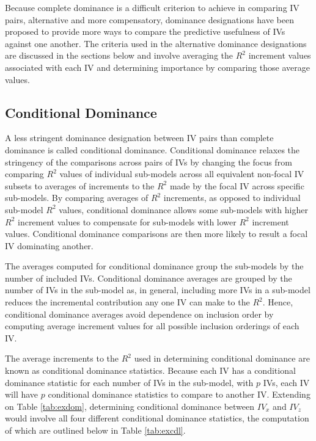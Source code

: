 \documentclass[ShortAfour,times,sageapa]{sagej}
\begin{document}
	Because complete dominance is a difficult criterion to achieve in comparing IV pairs, alternative and more compensatory, dominance designations have been proposed to provide more ways to compare the predictive usefulness of IVs against one another.
	The criteria used in the alternative dominance designations are discussed in the sections below and involve averaging the $R^2$ increment values associated with each IV and determining importance by comparing those average values.
	
	\subsection{Conditional Dominance}
	
	A less stringent dominance designation between IV pairs than complete dominance is called conditional dominance.
	Conditional dominance relaxes the stringency of the comparisons across pairs of IVs by changing the focus from comparing $R^2$ values of individual sub-models across all equivalent non-focal IV subsets to averages of increments to the $R^2$ made by the focal IV across specific sub-models.	
	By comparing averages of $R^2$ increments, as opposed to individual sub-model $R^2$ values, conditional dominance allows some sub-models with higher $R^2$ increment values to compensate for sub-models with lower $R^2$ increment values.
	Conditional dominance comparisons are then more likely to result a focal IV dominating another.
	
	The averages computed for conditional dominance group the sub-models by the number of included IVs.
	Conditional dominance averages are grouped by the number of IVs in the sub-model as, in general, including more IVs in a sub-model reduces the incremental contribution any one IV can make to the $R^2$.
	Hence, conditional dominance averages avoid dependence on inclusion order by computing average increment values for all possible inclusion orderings of each IV.
	
	The average increments to the $R^2$ used in determining conditional dominance are known as conditional dominance statistics.
	Because each IV has a conditional dominance statistic for each number of IVs in the sub-model, with $p$ IVs, each IV will have $p$ conditional dominance statistics to compare to another IV.
	Extending on Table \ref{tab:exdom}, determining conditional dominance between $IV_x$ and $IV_z$ would involve all four different conditional dominance statistics, the computation of which are outlined below in Table \ref{tab:excdl}.
	
\end{document}
